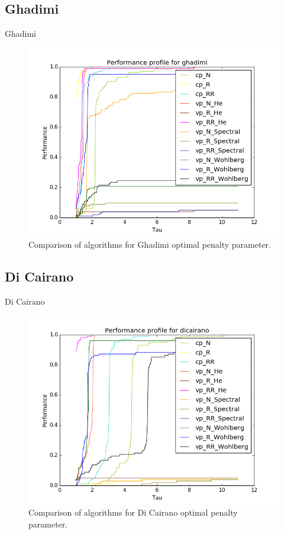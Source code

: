 \documentclass[8pt,red]{beamer}
\theoremstyle{plain}
\theoremstyle{definition}
\theoremstyle{remark}
\begin{document}
\subsection{Ghadimi}
\begin{frame}{Ghadimi}
\begin{figure}[hbtp]
\centering
\includegraphics[scale=0.4]{Results/Ghadimi_mini.png}
\caption{Comparison of algorithms for Ghadimi optimal penalty parameter.}
\end{figure}
\end{frame}

\subsection{Di Cairano}
\begin{frame}{Di Cairano}
\begin{figure}[hbtp]
\centering
\includegraphics[scale=0.4]{Results/DiCairano_mini.png}
\caption{Comparison of algorithms for Di Cairano optimal penalty parameter.}
\end{figure}
\end{frame}
\end{document}
